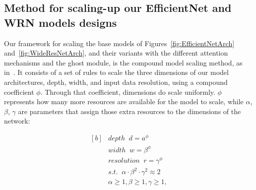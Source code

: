 \documentclass[journal]{IEEEtran}
\begin{document}
\subsection{Method for scaling-up our EfficientNet and WRN models designs}
\label{sec:scaleup}


Our framework for scaling the base models of Figures~\ref{fig:EfficientNetArch} and~\ref{fig:WideResNetArch}, and their variants with the different attention mechanisms and the ghost module, is the compound model scaling method, as in~\cite{pmlr-v97-tan19a}. It consists of a set of rules to scale the three dimensions of our model architectures, depth, width, and input data resolution, using a compound coefficient $\phi$. Through that coefficient, dimensions do scale uniformly. $\phi$ represents how many more resources are available for the model to scale, while $\alpha$, $\beta$, $\gamma$ are parameters that assign those extra resources to the dimensions of the network: 

\begin{equation}
    \label{eq:compound}
    \begin{aligned}[b]
    & depth \;\; d = a^{\phi}\\
    & width \;\; w = \beta^{\phi}\\
    & resolution \;\; r= \gamma^{\phi}\\
    & s.t. \;\; \alpha \cdot \beta^{2} \cdot \gamma^{2} \approx 2 \\
    & \alpha \geq 1,  \beta \geq 1, \gamma \geq 1,
    \end{aligned}
\end{equation}
\end{document}

